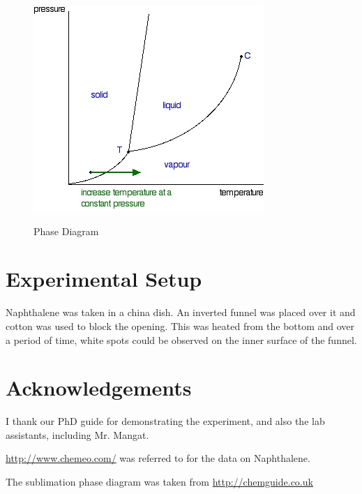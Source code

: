 	\begin{figure}[bth]
		\begin{center}
			\includegraphics[width=1.0\linewidth]{gfx/e12_phase}
		\end{center}
	\caption[Phase Diagram]{Phase Diagram} {\label{e12_phase}}
	\end{figure}


\section{Experimental Setup}
	Naphthalene was taken in a china dish. An inverted funnel was placed over it and cotton was used to block the opening. This was heated from the bottom and over a period of time, white spots could be observed on the inner surface of the funnel.

\section{Acknowledgements}
I thank our PhD guide for demonstrating the experiment, and also the lab assistants, including Mr. Mangat.
\par
\url{http://www.chemeo.com/} was referred to for the data on Naphthalene.
\par
The sublimation phase diagram was taken from \url{http://chemguide.co.uk}